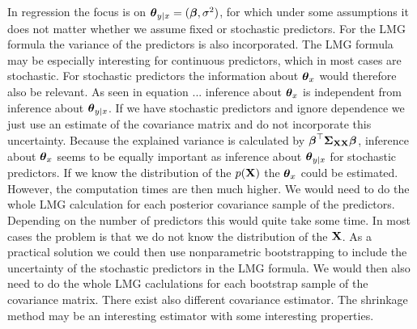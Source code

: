 \documentclass[11pt,a4paper,twoside]{book}
\begin{document}
  In regression the focus is on ${\boldsymbol{\theta}}{}_{y \mid x} = ({\boldsymbol{\beta}}, \sigma^2)$, for which under some assumptions it does not matter whether we assume fixed or stochastic predictors. For the LMG formula the variance of the predictors is also incorporated. The LMG formula may be especially interesting for continuous predictors, which in most cases are stochastic. For stochastic predictors the information about ${\boldsymbol{\theta}}{}_{x}$ would therefore also be relevant.  As seen in equation ... inference about ${\boldsymbol{\theta}}{}_{x}$  is independent from inference about ${\boldsymbol{\theta}}{}_{y \mid x}$. If we have stochastic predictors and ignore dependence we just use an estimate of the covariance matrix and do not incorporate this uncertainty.  Because the explained variance is calculated by ${\boldsymbol{\beta}}^\top {\boldsymbol{\Sigma}}{}_{{\mathbf{X}} {\mathbf{X}}}  {\boldsymbol{\beta}}$, inference about  ${\boldsymbol{\theta}}{}_{x}$  seems to be equally important as inference about ${\boldsymbol{\theta}}{}_{y \mid x}$ for stochastic predictors. If we know the distribution of the $p({\mathbf{X}})$ the ${\boldsymbol{\theta}}{}_{x}$ could be estimated. However, the computation times are then much higher. We would need to do the whole LMG calculation for each posterior covariance sample of the predictors. Depending on the number of predictors this would quite take some time.  In most cases the problem is that we do not know the distribution of the ${\mathbf{X}}$. As a practical solution we could then use nonparametric bootstrapping to include the uncertainty of the stochastic predictors in the LMG formula. We would then also need to do the whole LMG caclulations for each bootstrap sample of the covariance matrix. There exist also different covariance estimator. The shrinkage method may be an interesting estimator with some interesting properties. 
  
  
  
 
 
  
  
  
  
  
  
  
  
  

  
  
  
  
  
  
  
  
  











  
  
  
 
   
   
   
   
   

 

\end{document}
